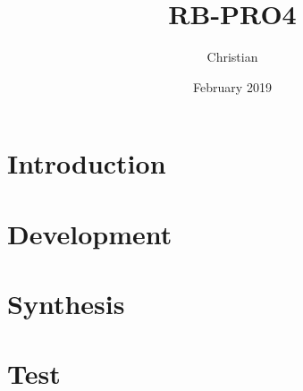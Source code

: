 \documentclass{report}
\title{RB-PRO4}
\author{Christian}
\date{February 2019}
\begin{document}

\maketitle

\begin{abstract}

\end{abstract}

\tableofcontents

\newpage
{}

\chapter{Introduction}


\chapter{Development}


\chapter{Synthesis}


\chapter{Test}


\newpage

\newpage
\printbibliography
\end{document}
